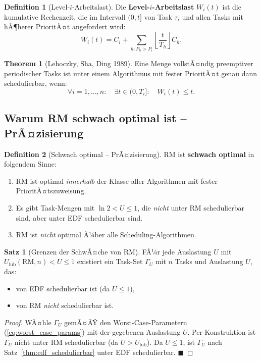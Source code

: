 ﻿\documentclass[a4paper,12pt]{report}
\theoremstyle{definition}
\newtheorem{definition}{Definition}[chapter]
\newtheorem{satz}{Satz}[chapter]
\newtheorem{theorem}{Theorem}[chapter]
\begin{document}
\begin{definition}[Level-$i$-Arbeitslast]
	Die \textbf{Level-$i$-Arbeitslast} $W_i(t)$ ist die kumulative Rechenzeit,
	die im Intervall $(0, t]$ von Task $\tau_i$ und allen Tasks mit hÃ¶herer PrioritÃ¤t
	angefordert wird:
	\[
		W_i(t) = C_i + \sum_{h: P_h > P_i} \left\lfloor \frac{t}{T_h} \right\rfloor C_h.
	\]
\end{definition}

\begin{theorem}[Lehoczky, Sha, Ding 1989]
	Eine Menge vollstÃ¤ndig preemptiver periodischer Tasks ist unter einem
	Algorithmus mit fester PrioritÃ¤t genau dann schedulierbar, wenn:
	\[
		\forall i = 1,\ldots,n: \quad \exists t \in (0, T_i]: \quad W_i(t) \leq t.
	\]
\end{theorem}

\subsection{Warum RM schwach optimal ist -- PrÃ¤zisierung}

\begin{definition}[Schwach optimal -- PrÃ¤zisierung]
	\label{def:schwach_optimal_praez}
	RM ist \textbf{schwach optimal} in folgendem Sinne:
	\begin{enumerate}
		\item RM ist optimal \emph{innerhalb} der Klasse aller Algorithmen mit
		      fester PrioritÃ¤tszuweisung.
		\item Es gibt Task-Mengen mit $\ln 2 < U \leq 1$, die \emph{nicht} unter
		      RM schedulierbar sind, aber unter EDF schedulierbar sind.
		\item RM ist \emph{nicht} optimal Ã¼ber alle Scheduling-Algorithmen.
	\end{enumerate}
\end{definition}

\begin{satz}[Grenzen der SchwÃ¤che von RM]
	FÃ¼r jede Auslastung $U$ mit $U_{\text{lub}}(\text{RM},n) < U \leq 1$ existiert
	ein Task-Set $\Gamma_U$ mit $n$ Tasks und Auslastung $U$, das:
	\begin{itemize}
		\item von EDF schedulierbar ist (da $U \leq 1$),
		\item von RM \emph{nicht} schedulierbar ist.
	\end{itemize}
\end{satz}

\begin{proof}
	WÃ¤hle $\Gamma_U$ gemÃ¤ÃŸ den Worst-Case-Parametern (\ref{eq:worst_case_params})
	mit der gegebenen Auslastung $U$. Per Konstruktion ist $\Gamma_U$ nicht unter RM
	schedulierbar (da $U > U_{\text{lub}}$). Da $U \leq 1$, ist $\Gamma_U$ nach
	Satz~\ref{thm:edf_schedulierbar} unter EDF schedulierbar. \hfill$\blacksquare$
\end{proof}
\end{document}

